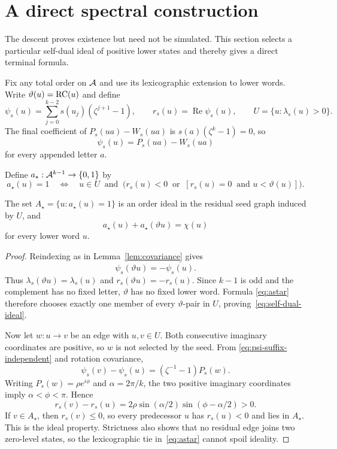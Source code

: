\section{A direct spectral construction}
\label{sec:direct}

The descent proves existence but need not be simulated.  This section
selects a particular self-dual ideal of positive lower states and thereby
gives a direct terminal formula.

Fix any total order on $\mathcal A$ and use its lexicographic extension to lower
words.  Write $\vartheta(u)=\operatorname{RC}(u)$ and define
\[
  \psi_s(u)=\sum_{j=0}^{k-2}s(u_j)(\zeta^{j+1}-1),\qquad
  r_s(u)=\operatorname{Re}\psi_s(u),\qquad
  U=\{u:\lambda_s(u)>0\}.
\]
The final coefficient of $P_s(ua)-W_s(ua)$ is
$s(a)(\zeta^k-1)=0$, so
\begin{equation}
  \psi_s(u)=P_s(ua)-W_s(ua)
  \label{eq:psi-suffix-independent}
\end{equation}
for every appended letter $a$.

Define $a_\star:\mathcal A^{k-1}\to\{0,1\}$ by
\begin{equation}
  a_\star(u)=1
  \quad\Longleftrightarrow\quad
  u\in U\ \text{ and }\
  \bigl(r_s(u)<0\ \text{ or }\
  [r_s(u)=0\ \text{ and }u<\vartheta(u)]\bigr).
  \label{eq:astar}
\end{equation}

\begin{lemma}
\label{lem:spectral-ideal}
The set $A_\star=\{u:a_\star(u)=1\}$ is an order ideal in the residual seed
graph induced by $U$, and
\begin{equation}
  a_\star(u)+a_\star(\vartheta u)=\chi(u)
  \label{eq:self-dual-ideal}
\end{equation}
for every lower word $u$.
\end{lemma}

\begin{proof}
Reindexing as in Lemma~\ref{lem:covariance} gives
\[
  \psi_s(\vartheta u)=-\overline{\psi_s(u)}.
\]
Thus $\lambda_s(\vartheta u)=\lambda_s(u)$ and
$r_s(\vartheta u)=-r_s(u)$.  Since $k-1$ is odd and the complement has no
fixed letter, $\vartheta$ has no fixed lower word.  Formula
\eqref{eq:astar} therefore chooses exactly one member of every
$\vartheta$-pair in $U$, proving~\eqref{eq:self-dual-ideal}.

Now let $w:u\to v$ be an edge with $u,v\in U$.  Both consecutive imaginary
coordinates are positive, so $w$ is not selected by the seed.  From
\eqref{eq:psi-suffix-independent} and rotation covariance,
\begin{equation}
  \psi_s(v)-\psi_s(u)=(\zeta^{-1}-1)P_s(w).
  \label{eq:r-increment}
\end{equation}
Writing $P_s(w)=\rho e^{i\phi}$ and $\alpha=2\pi/k$, the two positive
imaginary coordinates imply $\alpha<\phi<\pi$.  Hence
\[
  r_s(v)-r_s(u)
  =2\rho\sin(\alpha/2)\sin(\phi-\alpha/2)>0.
\]
If $v\in A_\star$, then $r_s(v)\leq0$, so every predecessor $u$ has
$r_s(u)<0$ and lies in $A_\star$.  This is the ideal property.  Strictness
also shows that no residual edge joins two zero-level states, so the
lexicographic tie in~\eqref{eq:astar} cannot spoil ideality.
\end{proof}

